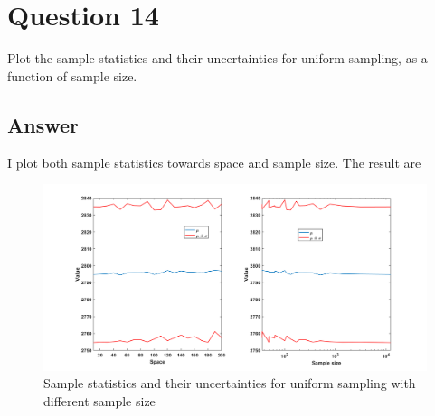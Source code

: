 \documentclass[
	12pt, %
]{fphw}
\begin{document}
\section*{Question 14 }

\begin{problem}
Plot the sample statistics and their uncertainties for uniform sampling, as a function of sample
size.
	
\end{problem}

\subsection*{Answer}
I plot both sample statistics towards space and sample size.  The result are

\begin{figure}[htbp]
	\centering
	\includegraphics[width=0.8\columnwidth]{samplespace3.png} 
	\caption{ Sample statistics and their uncertainties for uniform sampling with different sample size}
\end{figure}
\end{document}
